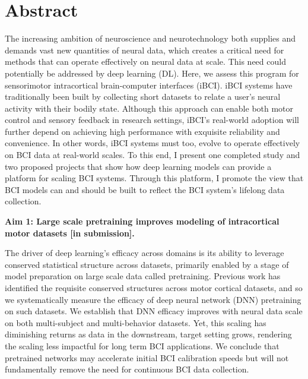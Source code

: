 \documentclass[12pt,oneside]{report}
\begin{document}
\section*{Abstract}
The increasing ambition of neuroscience and neurotechnology both supplies and demands vast new quantities of neural data, which creates a critical need for methods that can operate effectively on neural data at scale.
This need could potentially be addressed by deep learning (DL).
Here, we assess this program for sensorimotor intracortical brain-computer interfaces (iBCI). iBCI systems have traditionally been built by collecting short datasets to relate a user’s neural activity with their bodily state. Although this approach can enable both motor control and sensory feedback in research settings, iBCI's real-world adoption will further depend on achieving high performance with exquisite reliability and convenience. In other words, iBCI systems must too, evolve to operate effectively on BCI data at real-world scales.
To this end, I present one completed study and two proposed projects that show how deep learning models can provide a platform for scaling BCI systems. Through this platform, I promote the view that BCI models can and should be built to reflect the BCI system's lifelong data collection.


\textbf{Aim 1: Large scale pretraining improves modeling of intracortical motor datasets [in submission].}

The driver of deep learning’s efficacy across domains is its ability to leverage conserved statistical structure across datasets, primarily enabled by a stage of model preparation on large scale data called pretraining. Previous work has identified the requisite conserved structures across motor cortical datasets, and so we systematically measure the efficacy of deep neural network (DNN) pretraining on such datasets. We establish that DNN efficacy improves with neural data scale on both multi-subject and multi-behavior datasets. Yet, this scaling has diminishing returns as data in the downstream, target setting grows, rendering the scaling less impactful for long term BCI applications. We conclude that pretrained networks may accelerate initial BCI calibration speeds but will not fundamentally remove the need for continuous BCI data collection.
\end{document}
